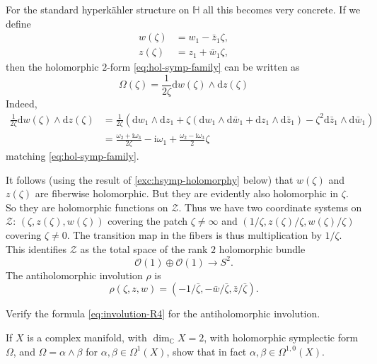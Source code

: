 \documentclass[12pt,letterpaper,reqno]{article}
\numberwithin{equation}{section}
\newcommand{\cZ}{\ensuremath{\mathcal Z}}
\newcommand{\cO}{\ensuremath{\mathcal O}}
\newcommand{\R}{\ensuremath{\mathbb R}}
\newcommand{\C}{\ensuremath{\mathbb C}}
\newcommand{\bbH}{\ensuremath{\mathbb H}}
\newcommand{\hk}{hyperk\"ahler\xspace}
\newcommand{\I}{{\mathrm i}}
\newcommand{\de}{\mathrm{d}}
\begin{document}
\begin{example}[Twistor space of $\R^4$] \label{exa:R4-twistor-space}
For the standard \hk structure on $\bbH$ all this becomes very
concrete.
If we define
\begin{align}
  w(\zeta) &= w_1 - \bar{z}_1 \zeta, \\
  z(\zeta) &= z_1 + \bar{w}_1 \zeta,
\end{align}
then the holomorphic $2$-form \eqref{eq:hol-symp-family}
can be written as
\begin{equation}
  \Omega(\zeta) = \frac{1}{2\zeta} \de w(\zeta) \wedge \de z(\zeta)
\end{equation}
Indeed,
\begin{align}
  \frac{1}{2\zeta} \de w(\zeta) \wedge \de z(\zeta) &= \frac{1}{2\zeta} (\de w_1 \wedge \de z_1 + \zeta (\de w_1 \wedge \de \bar{w}_1 + \de z_1 \wedge \de \bar{z}_1) - \zeta^2 \de \bar{z}_1 \wedge \de \bar{w}_1) \\
  &= \frac{\omega_2 + \I \omega_3}{2\zeta} - \I\omega_1 + \frac{\omega_2 - \I \omega_3}{2} \zeta
\end{align}
matching \eqref{eq:hol-symp-family}.

It follows (using the result of \autoref{exc:hsymp-holomorphy} below)
that $w(\zeta)$ and $z(\zeta)$ are fiberwise holomorphic.
But they are evidently also holomorphic in $\zeta$. So they are
holomorphic functions on $\cZ$.
Thus we have two coordinate systems on $\cZ$:
$(\zeta, z(\zeta), w(\zeta))$
covering the patch $\zeta \neq \infty$ and $(1/\zeta, z(\zeta)/\zeta, w(\zeta)/\zeta)$ covering $\zeta \neq 0$. The transition map
in the fibers is thus multiplication by $1/\zeta$.
This identifies
$\cZ$ as the total space of the rank $2$ holomorphic bundle
\begin{equation}
  \cO(1) \oplus \cO(1) \to S^2.
\end{equation}
The antiholomorphic involution $\rho$ is
\begin{equation} \label{eq:involution-R4}
  \rho(\zeta, z, w) = (-1/\bar\zeta, -\bar w / \bar\zeta, \bar z / \bar \zeta).
\end{equation}
\end{example}

\begin{exercise}
Verify the formula \eqref{eq:involution-R4} for the antiholomorphic
involution.
\end{exercise}

\begin{exercise} \label{exc:hsymp-holomorphy}
If $X$ is a complex manifold, with $\dim_\C X = 2$, with holomorphic symplectic form
$\Omega$, and $\Omega = \alpha \wedge \beta$ for $\alpha,\beta \in \Omega^1(X)$,
show that in fact $\alpha, \beta \in \Omega^{1,0}(X)$.
\end{exercise}
\end{document}
